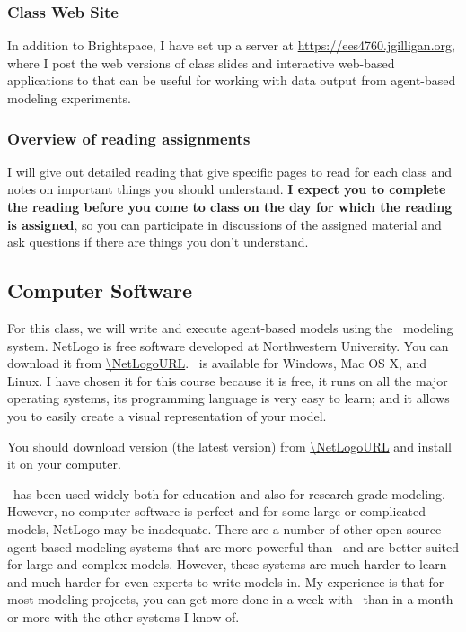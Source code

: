 \documentclass[11pt,twoside]{jgsyllabus}\usepackage[]{graphicx}\usepackage[]{xcolor}
\begin{document}
\subsubsection{Class Web Site}
In addition to Brightspace,
I have set up a server at \url{https://ees4760.jgilligan.org}, where I post the
web versions of class slides and interactive web-based applications to that can
be useful for working with data output from agent-based modeling experiments.

\subsubsection{Overview of reading assignments}
I will give out detailed reading that give specific pages to read for each class
and notes on important things you should understand.
\textbf{I expect you to complete the reading before you come to class on the day
for which the reading is assigned}, so you can participate in discussions of the
assigned material and ask questions if there are things you don't understand.

\subsection{Computer Software}
For this class, we will write and execute agent-based models using the \NetLogo\
modeling system. NetLogo is free software developed at Northwestern University.
You can download it from \url{\NetLogoURL}.
\NetLogo\ is available for Windows, Mac OS X, and Linux.
I have chosen it for this course because it is free, it runs on all the major
operating systems, its programming language is very easy to learn; and it allows
you to easily create a visual representation of your model.

You should download \NetLogo{} version \NetLogoVersion{}
(the latest version) from
\url{\NetLogoURL}
and install it on your computer.

\NetLogo\ has been used widely both for education and also for research-grade
modeling. However, no computer software is perfect and for some large or
complicated models, NetLogo may be inadequate.
There are a number of other
open-source agent-based modeling systems that are more powerful than \NetLogo\
and are better suited for large and complex models. However, these systems are
much harder to learn and much harder for even experts to write models in.
My experience is that for most modeling projects, you can get more done in a
week with \NetLogo\ than in a month or more with the other systems I know of.
\end{document}
